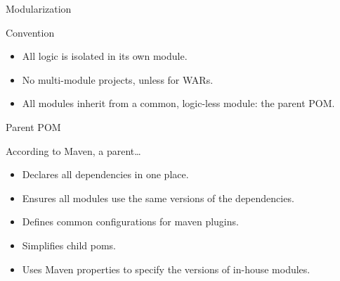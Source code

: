 \documentclass[presentation]{beamer}
\begin{document}
{
\begin{frame}[label=sec-5-2]{Modularization}

\begin{block}{Convention}
\begin{itemize}
\item All logic is isolated in its own module.
\item No multi-module projects, unless for WARs.
\item All modules inherit from a common, logic-less module: the parent POM.
\end{itemize}
\end{block}
\end{frame}
} %

{
\begin{frame}[label=sec-5-3]{Parent POM}

\begin{block}{According to Maven, a parent\ldots{}}

\begin{itemize}
\item Declares all dependencies in one place.
\item Ensures all modules use the same versions of the dependencies.
\item Defines common configurations for maven plugins.
\item Simplifies child poms.
\item Uses Maven properties to specify the versions of in-house modules.
\end{itemize}
\end{block}
\end{frame}
} %
\end{document}
